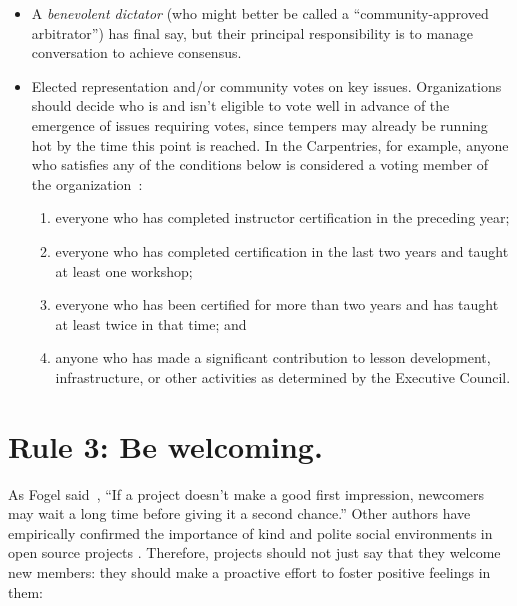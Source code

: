 \documentclass[10pt,letterpaper]{article}
\newcommand{\rulemajor}[1]{\section*{#1}}
\begin{document}
\begin{itemize}
	
\item
  A \emph{benevolent dictator} (who might better be called a ``community-approved arbitrator'') has final say,
  but their principal responsibility is to manage conversation to achieve consensus.
	
\item
  Elected representation and/or community votes on key issues.
  Organizations should decide who is and isn't eligible to vote well in advance of the emergence of issues requiring votes,
  since tempers may already be running hot by the time this point is reached.
  In the Carpentries,
  for example,
  anyone who satisfies any of the conditions below is considered a voting member of the organization~\cite{carpentries-bylaws}:
  \begin{enumerate}
  \item
    everyone who has completed instructor certification in the preceding year;
  \item
    everyone who has completed certification in the last two years and taught at least one workshop;
  \item
    everyone who has been certified for more than two years and has taught at least twice in that time; and
  \item
    anyone who has made a significant contribution to lesson development, infrastructure, or other activities
    as determined by the Executive Council.
  \end{enumerate}

\end{itemize}

\rulemajor{Rule 3: Be welcoming.}

As Fogel said~\cite{fogel2005},
``If a project doesn't make a good first impression, newcomers may wait a long time before giving it a second chance.''
Other authors have empirically confirmed the importance of kind and polite social environments
in open source projects \cite{singh2012,steinmacher2013,steinmacher2018}.
Therefore,
projects should not just say that they welcome new members:
they should make a proactive effort to foster positive feelings in them:
\end{document}
